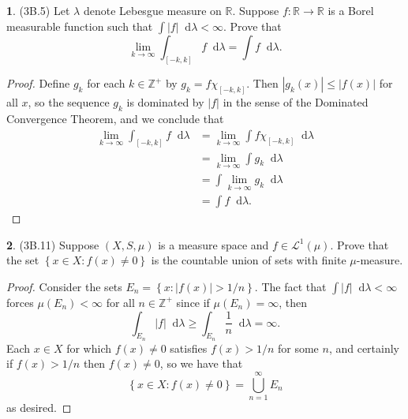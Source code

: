 \documentclass[12pt]{article}
\newcommand{\dd}{\mathop{}\!\mathrm{d}}
\theoremstyle{definition}
\newtheorem{ex}{}
\begin{document}
\begin{ex}
	(3B.5)
	Let $\lambda$ denote Lebesgue measure on $\mathbb{R}$.
	Suppose $f : \mathbb{R} \to \mathbb{R}$ is a Borel measurable function such that $\int |f| \dd \lambda < \infty$.
	Prove that \begin{equation*}
		\lim_{k \to \infty} \int_{[-k, k]} f \dd \lambda = \int f \dd \lambda.
	\end{equation*}
\end{ex}
\begin{proof}
	Define $g_k$ for each $k \in \mathbb{Z}^+$ by $g_k = f\chi_{[-k, k]}$.
	Then $|g_k(x)| \leq |f(x)|$ for all $x$, so the sequence $g_k$ is dominated by $|f|$ in the sense of the Dominated Convergence Theorem, and we conclude that \begin{align*}
		\lim_{k \to \infty} \int_{[-k, k]} f\dd\lambda & = \lim_{k\to\infty}\int f\chi_{[-k,k]} \dd\lambda \\
		                                               & = \lim_{k\to\infty}\int g_k \dd\lambda            \\
		                                               & = \int\lim_{k\to\infty} g_k \dd\lambda            \\
		                                               & = \int f \dd\lambda.
	\end{align*}
\end{proof}

\begin{ex}
	(3B.11)
	Suppose $(X, S, \mu)$ is a measure space and $f \in \mathcal{L}^1(\mu)$.
	Prove that the set $\left\lbrace x \in X : f(x) \neq 0 \right\rbrace$ is the countable union of sets with finite $\mu$-measure.
\end{ex}
\begin{proof}
	Consider the sets $E_n = \left\lbrace x : |f(x)| > 1/n \right\rbrace$.
	The fact that $\int |f| \dd\lambda < \infty$ forces $\mu(E_n) < \infty$ for all $n \in \mathbb{Z}^+$ since if $\mu(E_n) = \infty$, then \begin{equation*}
		\int_{E_n} |f| \dd\lambda \geq \int_{E_n} \frac{1}{n} \dd\lambda = \infty.
	\end{equation*}
	Each $x \in X$ for which $f(x) \neq 0$ satisfies $f(x) > 1/n$ for some $n$, and certainly if $f(x) > 1/n$ then $f(x) \neq 0$, so we have that \begin{equation*}
		\left\lbrace x \in X : f(x) \neq 0 \right\rbrace = \bigcup_{n=1}^\infty E_n
	\end{equation*}
	as desired.
\end{proof}
\end{document}

